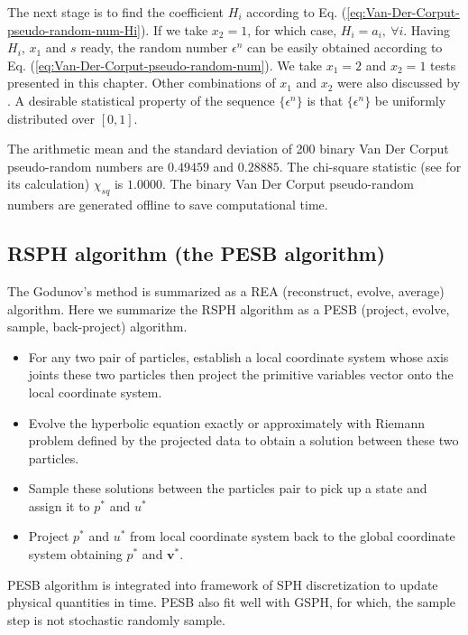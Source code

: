 The next stage is to find the coefficient $H_i$ according to Eq. (\ref{eq:Van-Der-Corput-pseudo-random-num-Hi}). If we take $x_2 = 1$, for which case, $H_i = a_i, \ \forall i$. Having $H_i$, $x_1$ and $s$ ready, the random number $\epsilon ^n $ can be easily obtained according to Eq. (\ref{eq:Van-Der-Corput-pseudo-random-num}).
We take $x_1=2$  and $x_2 =1$ tests presented in this chapter. Other combinations of $x_1$ and $x_2$ were also discussed by \citet{toro2013riemann}. A desirable statistical property of the sequence $\{\epsilon ^n\}$ is that $\{\epsilon ^n\}$ be uniformly distributed over $[0,1]$.
 
The arithmetic mean and the standard deviation of 200 binary Van Der Corput pseudo-random numbers are $0.49459$ and $0.28885$. The chi-square statistic (see \citet{toro2013riemann} for its calculation) $\chi_{sq}$ is $1.0000$. 
The binary Van Der Corput pseudo-random numbers are generated offline to save computational time.


\subsection{RSPH algorithm (the PESB algorithm)}
The Godunov's method is summarized as a REA (reconstruct, evolve, average) algorithm. Here we summarize the RSPH algorithm as a PESB (project, evolve, sample, back-project) algorithm. 
\begin{itemize}
\item For any two pair of particles, establish a local coordinate system whose axis joints these two particles then project the primitive variables vector onto the local coordinate system.
\item Evolve the hyperbolic equation exactly or approximately with Riemann problem defined by the projected data to obtain a solution between these two particles.
\item Sample these solutions between the particles pair to pick up a state and assign it to $p^{\ast}$ and $u^{\ast}$
\item Project $p^{\ast}$ and $u^{\ast}$ from local coordinate system back to the global coordinate system obtaining $p^{\ast}$ and $\textbf{v}^{\ast}$.
\end{itemize}
PESB algorithm is integrated into framework of SPH discretization to update physical quantities in time. PESB also fit well with GSPH, for which, the sample step is not stochastic randomly sample.

